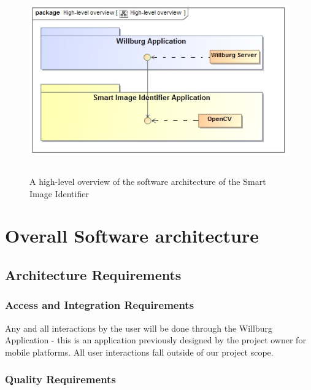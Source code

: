 \documentclass[a4paper,12pt]{report}
\begin{document}
	\begin{figure}[htb]
		\centering
		\includegraphics [height= 8cm, width=15cm]{../Diagrams/SystemOverview.png}
		\caption{A high-level overview of the software architecture of the Smart Image Identifier}
	\end{figure}


\section {Overall Software architecture}	
\subsection{Architecture Requirements}
\subsubsection{Access and Integration Requirements}
Any and all interactions by the user will be done through the Willburg Application - this is an application previously designed by the project owner for mobile platforms. All user interactions fall outside of our project scope. 
\newpage
\subsubsection{Quality Requirements}
\end{document}
